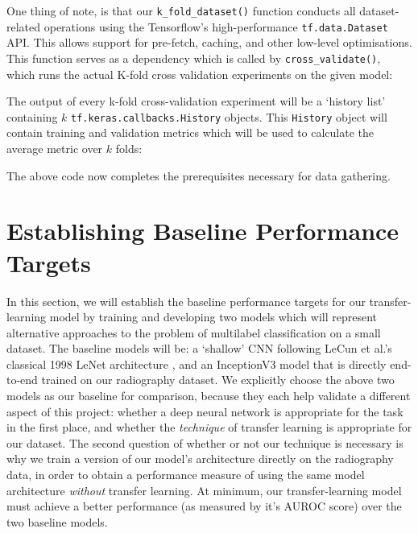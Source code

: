 

\noindent
One thing of note, is that our \texttt{k_fold_dataset()} function conducts all dataset-related operations using the Tensorflow's high-performance \texttt{tf.data.Dataset} API. This allows support for pre-fetch, caching, and other low-level optimisations. This function serves as a dependency which is called by \texttt{cross_validate()}, which runs the actual K-fold cross validation experiments on the given model:



\noindent
The output of every k-fold cross-validation experiment will be a \enquote*{history list} containing \(k\) \texttt{tf.keras.callbacks.History} objects. This \texttt{History} object will contain training and validation metrics which will be used to calculate the average metric over \(k\) folds:



\noindent
The above code now completes the prerequisites necessary for data gathering.

\section{Establishing Baseline Performance Targets}

In this section, we will establish the baseline performance targets for our transfer-learning model by training and developing two models which will represent alternative approaches to the problem of multilabel classification on a small dataset. The baseline models will be: a \enquote*{shallow} CNN following LeCun et al.'s classical 1998 LeNet architecture \autocite{lenet1998}, and an InceptionV3 model that is directly end-to-end trained on our radiography dataset. We explicitly choose the above two models as our baseline for comparison, because they each help validate a different aspect of this project: whether a deep neural network is appropriate for the task in the first place, and whether the \emph{technique} of transfer learning is appropriate for our dataset. The second question of whether or not our technique is necessary is why we train a version of our model's architecture directly on the radiography data, in order to obtain a performance measure of using the same model architecture \emph{without} transfer learning. At minimum, our transfer-learning model must achieve a better performance (as measured by it's AUROC score) over the two baseline models.

